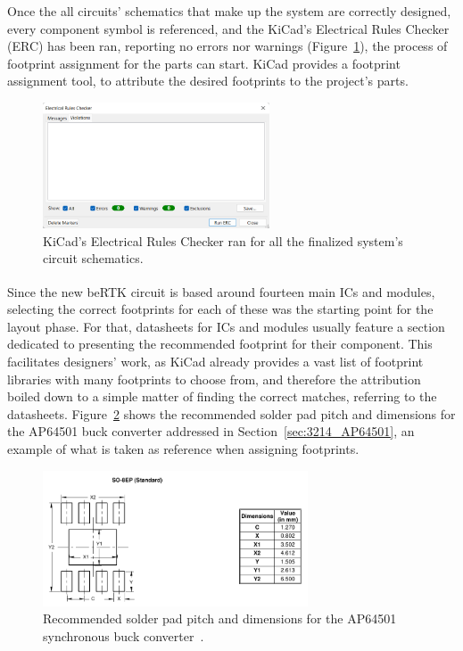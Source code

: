 Once the all circuits' schematics that make up the system are correctly designed, every component symbol is referenced, and the KiCad's Electrical Rules Checker (ERC) has been ran, reporting no errors nor warnings (Figure~\ref{fig:ERC_errors}), the process of footprint assignment for the parts can start. KiCad provides a footprint assignment tool, to attribute the desired footprints to the project's parts.
\begin{figure}[h]
	\centering
	\includegraphics[width=0.6\textwidth]{Chapters/Figures/chapter5/ERC.png}
	\caption{KiCad's Electrical Rules Checker ran for all the finalized system's circuit schematics.}
	\label{fig:ERC_errors}
\end{figure}
Since the new beRTK\textsuperscript{\textregistered} circuit is based around fourteen main ICs and modules, selecting the correct footprints for each of these was the starting point for the layout phase. For that, datasheets for ICs and modules usually feature a section dedicated to presenting the recommended footprint for their component. This facilitates designers' work, as KiCad already provides a vast list of footprint libraries with many footprints to choose from, and therefore the attribution boiled down to a simple matter of finding the correct matches, referring to the datasheets. Figure~\ref{fig:footprint_AP64501} shows the recommended solder pad pitch and dimensions for the AP64501 buck converter addressed in Section~\ref{sec:3214_AP64501}, an example of what is taken as reference when assigning footprints.

\begin{figure}[h]
	\centering
	\includegraphics[width=0.7\textwidth]{Chapters/Figures/chapter5/footprint_AP64501.pdf}
	\caption{Recommended solder pad pitch and dimensions for the AP64501 synchronous buck converter~\cite{AP64501}.}
	\label{fig:footprint_AP64501}
\end{figure}


